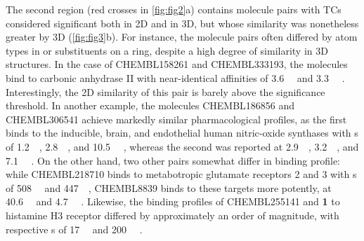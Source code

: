 \documentclass[../../main.tex]{subfiles}
\begin{document}
\begin{refsection}
	The second region (red crosses in \cref{fig:fig2}a) contains molecule pairs with TCs considered significant both in 2D and in 3D, but whose similarity was nonetheless greater by 3D (\cref{fig:fig3}b).
	For instance, the molecule pairs often differed by atom types in or substituents on a ring, despite a high degree of similarity in 3D structures.
	In the case of CHEMBL158261 and CHEMBL333193, the molecules bind to carbonic anhydrase II with near-identical affinities of \SI{3.6}{\nano\molar} and \SI{3.3}{\nano\molar} \supercite{ponticello_1987}.
	Interestingly, the 2D similarity of this pair is barely above the significance threshold.
	In another example, the molecules CHEMBL186856 and CHEMBL306541 achieve markedly similar pharmacological profiles, as the first binds to the inducible, brain, and endothelial human nitric-oxide synthases with  \ICfifty s of \SI{1.2}{\micro\molar}, \SI{2.8}{\micro\molar}, and \SI{10.5}{\micro\molar} \supercite{shankaran_2004}, whereas the second was reported at \SI{2.9}{\micro\molar}, \SI{3.2}{\micro\molar}, and \SI{7.1}{\micro\molar} \supercite{moore_1996}.
	On the other hand, two other pairs somewhat differ in binding profile: while CHEMBL218710 binds to metabotropic glutamate receptors 2 and 3 with \Ki s of \SI{508}{\nano\molar} and \SI{447}{\nano\molar}, CHEMBL8839 binds to these targets more potently, at \SI{40.6}{\nano\molar} and \SI{4.7}{\nano\molar} \supercite{monn_2007}.
	Likewise, the binding profiles of CHEMBL255141 and \textbf{1} to histamine H3 receptor differed by approximately an order of magnitude, with respective  \Ki s of \SI{17}{\nano\molar} and \SI{200}{\nano\molar} \supercite{nersesian_2008}.


\end{refsection}
\end{document}
